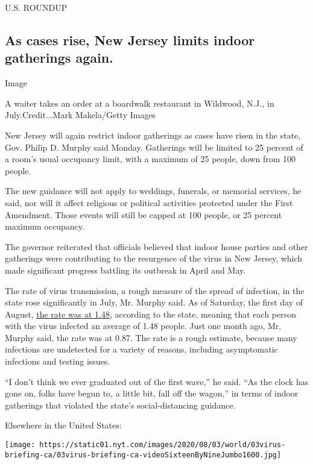 U.S. ROUNDUP

\hypertarget{as-cases-rise-new-jersey-limits-indoor-gatherings-again}{%
\subsection{As cases rise, New Jersey limits indoor gatherings
again.}\label{as-cases-rise-new-jersey-limits-indoor-gatherings-again}}

Image

A waiter takes an order at a boardwalk restaurant in Wildwood, N.J., in
July.Credit...Mark Makela/Getty Images

New Jersey will again restrict indoor gatherings as cases have risen in
the state, Gov. Philip D. Murphy said Monday. Gatherings will be limited
to 25 percent of a room's usual occupancy limit, with a maximum of 25
people, down from 100 people.

The new guidance will not apply to weddings, funerals, or memorial
services, he said, nor will it affect religious or political activities
protected under the First Amendment. Those events will still be capped
at 100 people, or 25 percent maximum occupancy.

The governor reiterated that officials believed that indoor house
parties and other gatherings were contributing to the resurgence of the
virus in New Jersey, which made significant progress battling its
outbreak in April and May.

The rate of virus transmission, a rough measure of the spread of
infection, in the state rose significantly in July, Mr. Murphy said. As
of Saturday, the first day of August,
\href{https://twitter.com/GovMurphy/status/1290335172446097409/photo/2}{the
rate was at 1.48}, according to the state, meaning that each person with
the virus infected an average of 1.48 people. Just one month ago, Mr.
Murphy said, the rate was at 0.87. The rate is a rough estimate, because
many infections are undetected for a variety of reasons, including
asymptomatic infections and testing issues.

``I don't think we ever graduated out of the first wave,'' he said. ``As
the clock has gone on, folks have begun to, a little bit, fall off the
wagon,'' in terms of indoor gatherings that violated the state's
social-distancing guidance.

Elsewhere in the United States:

\texttt{[image: https://static01.nyt.com/images/2020/08/03/world/03virus-briefing-ca/03virus-briefing-ca-videoSixteenByNineJumbo1600.jpg]}


